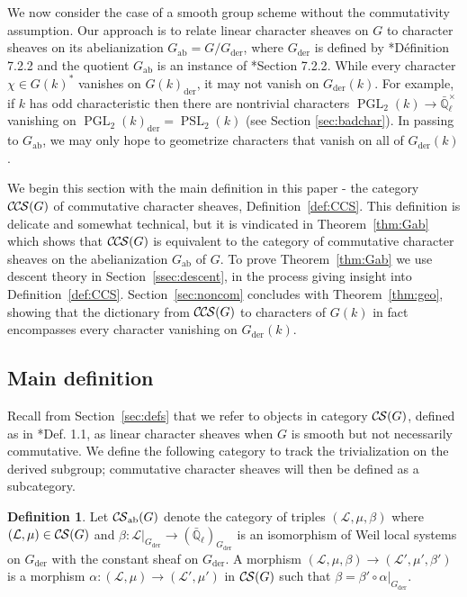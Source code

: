 \documentclass[10pt]{amsart}
\theoremstyle{plain}
\theoremstyle{definition}
\newtheorem{definition}[theorem]{Definition}
\newcommand{\EE}{\mathbb{\bar Q}_\ell}
\newcommand{\EEx}{\EE^\times}
\DeclareMathOperator{\PGL}{PGL}
\DeclareMathOperator{\PSL}{PSL}
\newcommand{\der}{_{\operatorname{der}}}
\newcommand{\ab}{_{\operatorname{ab}}}
\newcommand{\cs}[1]{{\mathcal{#1}}}
\newcommand{\CS}{{\mathcal{C\hskip-0.8pt S}}}
\newcommand{\CCS}{{\mathcal{C\hskip-.8pt C\hskip-0.8pt S}}}
\begin{document}
We now consider the case of a smooth group scheme without the commutativity assumption.  Our approach
is to relate linear character sheaves on $G$ to character sheaves on its abelianization $G\ab = G / G\der$, where $G\der$ is defined by \cite{demazure:SGA3-VIB}*{D\'efinition 7.2.2} and the quotient $G\ab$ is an instance of  \cite{demazure:SGA3-VIA}*{Section 7.2.2}.
While every character $\chi \in G(k)^*$ vanishes on $G(k)\der$, it may not vanish on $G\der(k)$.  For example,
if $k$ has odd characteristic then there are nontrivial characters $\PGL_2(k) \to \EEx$ vanishing on
$\PGL_2(k)\der = \PSL_2(k)$ (see Section \ref{sec:badchar}).  In passing to $G\ab$,
we may only hope to geometrize characters that vanish on all of $G\der(k)$.

We begin this section with the main definition in this paper - the category $\CCS(G)$ of commutative character sheaves, Definition~\ref{def:CCS}. 
This definition is delicate and somewhat technical, but it is vindicated in Theorem~\ref{thm:Gab} which shows that $\CCS(G)$ is equivalent to the category of commutative character sheaves on the abelianization $G\ab$ of $G$. 
To prove Theorem~\ref{thm:Gab} we use descent theory in Section~\ref{ssec:descent}, in the process giving insight into Definition~\ref{def:CCS}. 
Section~\ref{sec:noncom} concludes with Theorem~\ref{thm:geo}, showing that the dictionary from $\CCS(G)$
to characters of $G(k)$ in fact encompasses every character vanishing on $G\der(k)$.

\subsection{Main definition}\label{ssec:noncomdef}

Recall from Section~\ref{sec:defs} that we refer to objects in category $\CS(G)$, defined as
in \cite{cunningham-roe:13a}*{Def. 1.1}, as linear character sheaves when $G$ is smooth but
not necessarily commutative.  
We define the following category to track the trivialization on the derived subgroup;
commutative character sheaves will then be defined as a subcategory.


\begin{definition}\label{def:CSab}
Let $\CS\ab(G)$ denote the category of triples $(\cs{L},\mu,\beta)$ where $(\cs{L},\mu) \in \CS(G)$ and
$\beta : \cs{L}\vert_{G\der} \to (\EE)_{G\der}$ is an isomorphism of Weil local systems on $G\der$ with the constant sheaf on $G\der$.
A morphism $(\cs{L},\mu,\beta)\to (\cs{L}',\mu',\beta')$ is a morphism $\alpha : (\cs{L},\mu)\to (\cs{L}',\mu')$
in $\CS(G)$ such that $\beta = \beta' \circ \alpha\vert_{G\der}$.  
\end{definition}
\end{document}
